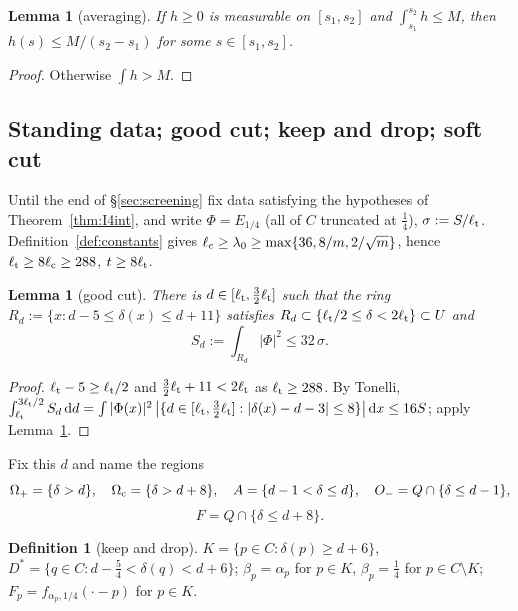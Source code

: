 \documentclass[11pt]{article}
\newtheorem{lemma}[theorem]{Lemma}
\theoremstyle{definition}
\newtheorem{definition}[theorem]{Definition}
\theoremstyle{remark}
\newcommand{\dd}{\,\mathrm d}
\newcommand{\dep}{\delta}
\newcommand{\lc}{\ell_{\rm c}}
\newcommand{\lt}{\ell_{\rm t}}
\begin{document}
\begin{lemma}[averaging]\label{lem:avg}
If $h\ge0$ is measurable on $[s_1,s_2]$ and $\int_{s_1}^{s_2}h\le M$, then $h(s)\le M/(s_2-s_1)$ for some $s\in[s_1,s_2]$.
\end{lemma}
\begin{proof}Otherwise $\int h>M$.\end{proof}

\subsection{Standing data; good cut; keep and drop; soft cut}
Until the end of \S\ref{sec:screening} fix data satisfying the hypotheses of Theorem~\ref{thm:I4int}, and write $\Phi=E_{1/4}$ (all of $C$
truncated at $\frac14$), $\sigma:=S/\lt$. Definition~\ref{def:constants} gives $\lc\ge\lambda_0\ge\max\{36,8/m,2/\sqrt m\}$, hence
$\lt\ge8\lc\ge288$, $t\ge8\lt$.

\begin{lemma}[good cut]\label{lem:goodcut}
There is $d\in[\lt,\frac32\lt]$ such that the ring $R_d:=\{x:d-5\le\dep(x)\le d+11\}$ satisfies $R_d\subset\{\lt/2\le\dep<2\lt\}\subset U$ and
\[
S_d:=\int_{R_d}|\Phi|^2\le32\,\sigma .
\]
\end{lemma}
\begin{proof}
$\lt-5\ge\lt/2$ and $\frac32\lt+11<2\lt$ as $\lt\ge288$. By Tonelli,
$\int_{\lt}^{3\lt/2}S_d\dd d=\int|\Phi(x)|^2\,\bigl|\{d\in[\lt,\tfrac32\lt]:|\dep(x)-d-3|\le8\}\bigr|\dd x\le16S$; apply Lemma~\ref{lem:avg}.
\end{proof}

Fix this $d$ and name the regions
\[
\Omega_+=\{\dep>d\},\quad \Omega_{\rm c}=\{\dep>d+8\},\quad A=\{d-1<\dep\le d\},\quad O_-=Q\cap\{\dep\le d-1\},
\]
\[
F=Q\cap\{\dep\le d+8\}.
\]

\begin{definition}[keep and drop]\label{def:keep}
$K=\{p\in C:\dep(p)\ge d+6\}$, $D^\ast=\{q\in C:d-\frac54<\dep(q)<d+6\}$; $\beta_p=\alpha_p$ for $p\in K$, $\beta_p=\frac14$ for $p\in C\setminus K$;
$F_p=f_{\alpha_p,1/4}(\cdot-p)$ for $p\in K$.
\end{definition}
\end{document}

